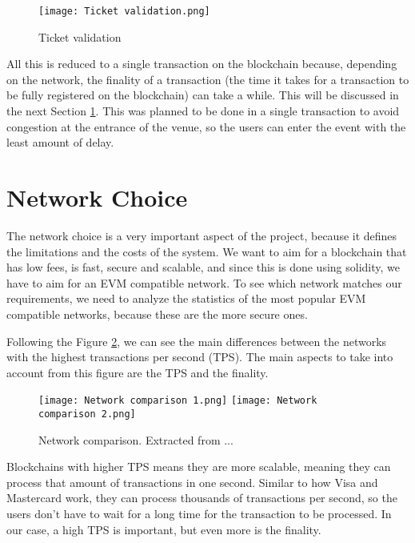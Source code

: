 \begin{figure}[H]
    \texttt{[image: Ticket validation.png]}
    \centering
    \caption{Ticket validation}
    \label{fig:ticket_validation}
\end{figure}

All this is reduced to a single transaction on the blockchain because, depending on the network, the finality of a transaction (the time it takes for a transaction to be fully registered on the blockchain) can take a while. This will be discussed in the next Section \ref{sec:network_choice}. This was planned to be done in a single transaction to avoid congestion at the entrance of the venue, so the users can enter the event with the least amount of delay.

\section{Network Choice}
\label{sec:network_choice}

The network choice is a very important aspect of the project, because it defines the limitations and the costs of the system. We want to aim for a blockchain that has low fees, is fast, secure and scalable, and since this is done using solidity, we have to aim for an EVM compatible network. To see which network matches our requirements, we need to analyze the statistics of the most popular EVM compatible networks, because these are the more secure ones.

Following the Figure \ref{fig:network_comparison}, we can see the main differences between the networks with the highest transactions per second (TPS). The main aspects to take into account from this figure are the TPS and the finality.

\begin{figure}[H]
    \texttt{[image: Network comparison 1.png]}
    \texttt{[image: Network comparison 2.png]}
    \centering
    \caption{Network comparison. Extracted from ...}
    \label{fig:network_comparison}
\end{figure}

Blockchains with higher TPS means they are more scalable, meaning they can process that amount of transactions in one second. Similar to how Visa and Mastercard work, they can process thousands of transactions per second, so the users don't have to wait for a long time for the transaction to be processed. In our case, a high TPS is important, but even more is the finality.

